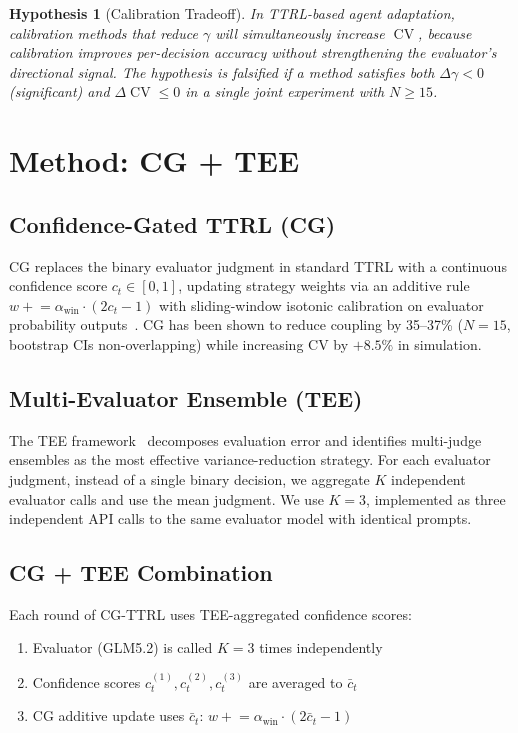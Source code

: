 \documentclass[11pt]{article}
\DeclareMathOperator{\CV}{CV}
\newtheorem{hypothesis}{Hypothesis}
\begin{document}
\begin{hypothesis}[Calibration Tradeoff]
In TTRL-based agent adaptation, calibration methods that reduce $\gamma$ will simultaneously increase $\CV$, because calibration improves per-decision accuracy without strengthening the evaluator's directional signal. The hypothesis is falsified if a method satisfies \textit{both} $\Delta\gamma < 0$ (significant) \textit{and} $\Delta\CV \leq 0$ in a single joint experiment with $N \geq 15$.
\end{hypothesis}

\section{Method: CG + TEE}

\subsection{Confidence-Gated TTRL (CG)}

CG replaces the binary evaluator judgment in standard TTRL with a continuous confidence score $c_t \in [0,1]$, updating strategy weights via an additive rule $w \mathrel{+}= \alpha_{\text{win}} \cdot (2c_t - 1)$ with sliding-window isotonic calibration on evaluator probability outputs~\cite{liu2026caleffects}. CG has been shown to reduce coupling by 35--37\% ($N{=}15$, bootstrap CIs non-overlapping) while increasing CV by $+8.5\%$ in simulation.

\subsection{Multi-Evaluator Ensemble (TEE)}

The TEE framework~\cite{messing2026tee} decomposes evaluation error and identifies multi-judge ensembles as the most effective variance-reduction strategy. For each evaluator judgment, instead of a single binary decision, we aggregate $K$ independent evaluator calls and use the mean judgment. We use $K{=}3$, implemented as three independent API calls to the same evaluator model with identical prompts.

\subsection{CG + TEE Combination}

Each round of CG-TTRL uses TEE-aggregated confidence scores:
\begin{enumerate}[leftmargin=*,nosep]
 \item Evaluator (GLM5.2) is called $K{=}3$ times independently
 \item Confidence scores $c_t^{(1)}, c_t^{(2)}, c_t^{(3)}$ are averaged to $\bar{c}_t$
 \item CG additive update uses $\bar{c}_t$: $w \mathrel{+}= \alpha_{\text{win}} \cdot (2\bar{c}_t - 1)$
\end{enumerate}
\end{document}
